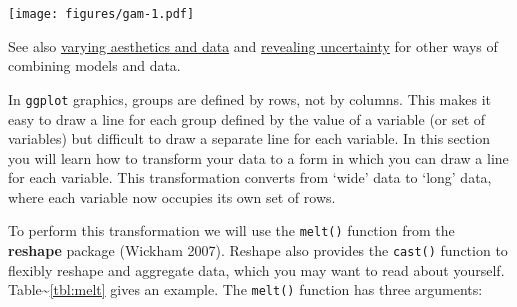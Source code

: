 \begin{Shaded}
\begin{Highlighting}[]
\NormalTok{>}\StringTok{ }\StringTok{ }\StringTok{ } \NormalTok{) +}\StringTok{ } 
\NormalTok{>}\StringTok{ }\StringTok{ }\NormalTok{(}
\NormalTok{+}\StringTok{   } \NormalTok{(}\NormalTok{, }\NormalTok{, } \NormalTok{),}
\NormalTok{+}\StringTok{   } 
\NormalTok{+}\StringTok{ }\NormalTok{))}
\NormalTok{>}\StringTok{ }\StringTok{ }
\NormalTok{>}\StringTok{ }   \NormalTok{)}
\end{Highlighting}
\end{Shaded}

\texttt{[image: figures/gam-1.pdf]}

See also \hyperref[sub:different-aesthetics]{varying aesthetics and
data} and \hyperref[sec:uncertainty]{revealing uncertainty} for other
ways of combining models and data.


In \texttt{ggplot} graphics, groups are defined by rows, not by columns.
This makes it easy to draw a line for each group defined by the value of
a variable (or set of variables) but difficult to draw a separate line
for each variable. In this section you will learn how to transform your
data to a form in which you can draw a line for each variable. This
transformation converts from `wide' data to `long' data, where each
variable now occupies its own set of rows. 

To perform this transformation we will use the \texttt{melt()} function
from the \textbf{reshape} package (Wickham 2007). Reshape also provides
the \texttt{cast()} function to flexibly reshape and aggregate data,
which you may want to read about yourself.
Table\textasciitilde{}\ref{tbl:melt} gives an example. The
\texttt{melt()} function has three arguments: 

